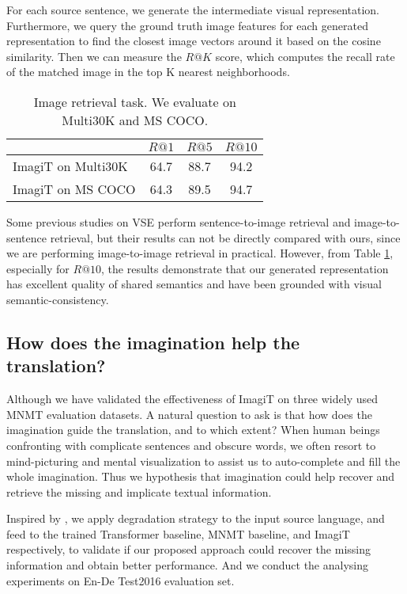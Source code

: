 \documentclass[11pt]{article}
\newcommand{\method}{ImagiT\xspace}
\begin{document}
For each source sentence, we generate the intermediate visual representation. Furthermore, we query the ground truth image features for each generated representation to find the closest image vectors around it based on the cosine similarity. Then we can measure the $R@K$ score, which computes the recall rate of the matched image in the top K nearest neighborhoods.

\begin{table}[h]
\centering
\begin{tabular}{l|ccc}
\hline
              & $R@1$     & $R@5$ &  $R@10$   \\ \hline
\method on Multi30K & 64.7  & 88.7 & 94.2 \\ \hline
\method on MS COCO & 64.3  &  89.5   & 94.7 \\
\hline
\end{tabular}
\caption{Image retrieval task. We evaluate on Multi30K and MS COCO.}
\label{retrieval}
\end{table}

Some previous studies on VSE perform sentence-to-image retrieval and image-to-sentence retrieval, but their results can not be directly compared with ours, since we are performing image-to-image retrieval in practical. However, from Table \ref{retrieval}, especially for $R@10$, the results demonstrate that our generated representation has excellent quality of shared semantics and have been grounded with visual semantic-consistency. 

\subsection{How does the imagination help the translation?}

Although we have validated the effectiveness of \method on three widely used MNMT evaluation datasets. A natural question to ask is that how does the imagination guide the translation, and to which extent? When human beings confronting with complicate sentences and obscure words, we often resort to mind-picturing and mental visualization to assist us to auto-complete and fill the whole imagination. Thus we hypothesis that imagination could help recover and retrieve the missing and implicate textual information.

Inspired by \citet{ive2019distilling,caglayan2019probing}, we apply degradation strategy to the input source language, and feed to the trained Transformer baseline, MNMT baseline, and \method respectively, to validate if our proposed approach could recover the missing information and obtain better performance. And we conduct the analysing experiments on En-De Test2016 evaluation set.
\end{document}
